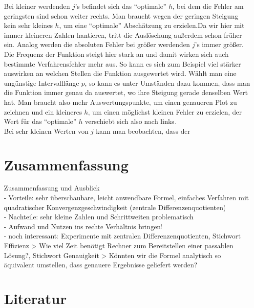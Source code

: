 \documentclass{scrartcl}
\begin{document}
Bei kleiner werdenden $j$'s befindet sich das "`optimale"' $h$, bei dem die Fehler am geringsten sind schon weiter rechts. Man braucht wegen der geringen Steigung kein sehr kleines $h$, um eine "`optimale"' Abschätzung zu erzielen.Da wir hier mit immer kleineren Zahlen hantieren, tritt die Auslöschung außerdem schon früher ein.
Analog werden die absoluten Fehler bei größer werdenden $j$'s immer größer.
Die Frequenz der Funktion steigt hier stark an und damit wirken sich auch bestimmte Verfahrensfehler mehr aus. So kann es sich zum Beispiel viel stärker auswirken an welchen Stellen die Funktion ausgewertet wird. Wählt man eine ungünstige Intervalllänge $p$, so kann es unter Umständen dazu kommen, dass man die Funktion immer genau da auswertet, wo ihre Steigung gerade denselben Wert hat.
Man braucht also mehr Auswertungspunkte, um einen genaueren Plot zu zeichnen und ein kleineres $h$, um einen möglichst kleinen Fehler zu erzielen, der Wert für das "`optimale"' $h$ verschiebt sich also nach links.\\
Bei sehr kleinen Werten von $j$ kann man beobachten, dass der

\pagebreak \section{Zusammenfassung}
\label{sec:zusammenfassung}
Zusammenfassung und Ausblick \\
- Vorteile: sehr überschaubare, leicht anwendbare Formel, einfaches Verfahren mit
quadratischer Konvergenzgeschwindigkeit (zentrale Differenzenquotienten) \\
- Nachteile: sehr kleine Zahlen und Schrittweiten problematisch \\
- Aufwand und Nutzen ins rechte Verhältnis bringen! \\
- noch interessant: Experimente mit zentralen Differenzenquotienten, Stichwort
Effizienz > Wie viel Zeit benötigt Rechner zum Bereitstellen einer passablen Lösung?,
Stichwort Genauigkeit > Könnten wir die Formel analytisch so äquivalent umstellen,
dass genauere Ergebnisse geliefert werden? \\

\pagebreak \section{Literatur}
\label{sec:literatur}
\end{document}
